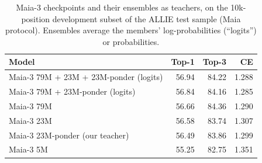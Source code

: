 \begin{table}[t]\centering\small
\caption{Maia-3 checkpoints and their ensembles as teachers, on the 10k-position development subset
of the ALLIE test sample (Maia protocol). Ensembles average the members' log-probabilities (``logits'') or probabilities.}
\label{tab:teachers}
\begin{tabular}{lrrr}\toprule
Model & Top-1 & Top-3 & CE\\\midrule
Maia-3 79M + 23M + 23M-ponder (logits) & 56.94 & 84.22 & 1.288\\
Maia-3 79M + 23M-ponder (logits) & 56.84 & 84.16 & 1.285\\
Maia-3 79M & 56.66 & 84.36 & 1.290\\
Maia-3 23M & 56.58 & 83.74 & 1.307\\
Maia-3 23M-ponder (our teacher) & 56.49 & 83.86 & 1.299\\
Maia-3 5M & 55.25 & 82.75 & 1.351\\
\bottomrule\end{tabular}\end{table}
